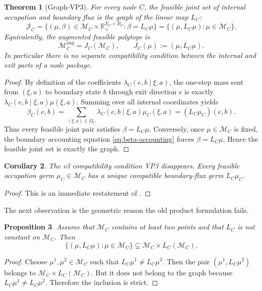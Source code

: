 \documentclass[12pt]{article}
\newtheorem{theorem}{Theorem}[section]
\newtheorem{proposition}[theorem]{Proposition}
\newtheorem{corollary}[theorem]{Corollary}
\theoremstyle{definition}
\newcommand{\R}{\mathbb{R}}
\newcommand{\1}{\mathbf{1}}
\newcommand{\cM}{\mathcal{M}}
\begin{document}
\begin{theorem}[Graph-VP3]
\label{thm:graphVP3}
For every node \(C\), the feasible joint set of internal occupation and boundary flux is
the graph of the linear map \(L_C\):
\[
\mathcal J_C
=
\bigl\{
(\mu,\beta)\in \cM_C\times \R_+^{E_C\times B_C}:\beta=L_C\mu
\bigr\}
=
\{(\mu,L_C\mu):\mu\in \cM_C\}.
\]
Equivalently, the augmented feasible polytope is
\[
\cM_C^{\mathrm{aug}}=J_C(\cM_C),
\qquad
J_C(\mu):=(\mu,L_C\mu).
\]
In particular there is no separate compatibility condition between the internal and exit
parts of a node package.
\end{theorem}

\begin{proof}
By definition of the coefficients \(\lambda_C(e,b\mid \xi,a)\), the one-step mass sent
from \((\xi,a)\) to boundary state \(b\) through exit direction \(e\) is exactly
\(\lambda_C(e,b\mid \xi,a)\mu(\xi,a)\).  Summing over all internal coordinates yields
\[
\beta_C(e,b)=\sum_{(\xi,a)\in \Omega_C}\lambda_C(e,b\mid \xi,a)\mu_C(\xi,a)=(L_C\mu_C)(e,b).
\]
Thus every feasible joint pair satisfies \(\beta=L_C\mu\).  Conversely, once
\(\mu\in \cM_C\) is fixed, the boundary accounting equation
\eqref{eq:beta-accounting} forces \(\beta=L_C\mu\).  Hence the feasible joint set is
exactly the graph.
\end{proof}

\begin{corollary}
\label{cor:automatic}
The v3 compatibility condition VP3 disappears.  Every feasible occupation germ
\(\mu_C\in \cM_C\) has a unique compatible boundary-flux germ \(L_C\mu_C\).
\end{corollary}

\begin{proof}
This is an immediate restatement of .
\end{proof}

The next observation is the geometric reason the old product formulation fails.

\begin{proposition}
\label{prop:product-fails}
Assume that \(\cM_C\) contains at least two points and that \(L_C\) is not constant on
\(\cM_C\).  Then
\[
\{(\mu,L_C\mu):\mu\in \cM_C\}
\subsetneq
\cM_C\times L_C(\cM_C).
\]
\end{proposition}

\begin{proof}
Choose \(\mu^1,\mu^2\in \cM_C\) such that \(L_C\mu^1\neq L_C\mu^2\).  Then the pair
\((\mu^1,L_C\mu^2)\) belongs to \(\cM_C\times L_C(\cM_C)\).  But it does not belong to
the graph because \(L_C\mu^1\neq L_C\mu^2\).  Therefore the inclusion is strict.
\end{proof}
\end{document}
